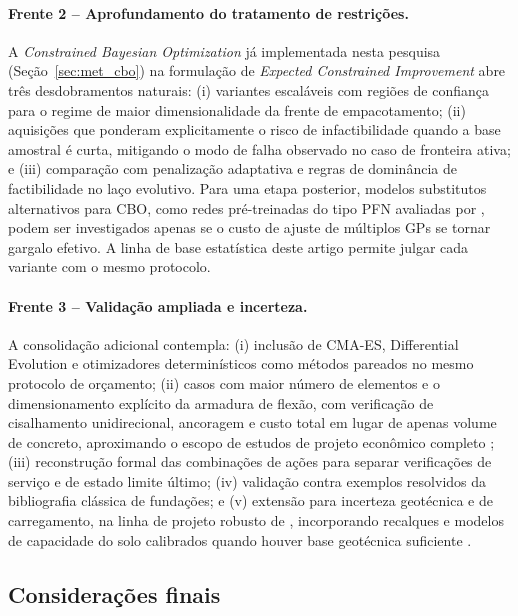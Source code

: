 \paragraph{Frente 2 -- Aprofundamento do tratamento de restrições.}
A \textit{Constrained Bayesian Optimization} já implementada nesta pesquisa (Seção~\ref{sec:met_cbo}) na formulação de \textit{Expected Constrained Improvement}  abre três desdobramentos naturais: (i) variantes escaláveis com regiões de confiança  para o regime de maior dimensionalidade da frente de empacotamento; (ii) aquisições que ponderam explicitamente o risco de infactibilidade quando a base amostral é curta, mitigando o modo de falha observado no caso de fronteira ativa; e (iii) comparação com penalização adaptativa e regras de dominância de factibilidade no laço evolutivo. Para uma etapa posterior, modelos substitutos alternativos para CBO, como redes pré-treinadas do tipo PFN avaliadas por , podem ser investigados apenas se o custo de ajuste de múltiplos GPs se tornar gargalo efetivo. A linha de base estatística deste artigo permite julgar cada variante com o mesmo protocolo.

\paragraph{Frente 3 -- Validação ampliada e incerteza.}
A consolidação adicional contempla: (i) inclusão de CMA-ES, Differential Evolution e otimizadores determinísticos como métodos pareados no mesmo protocolo de orçamento; (ii) casos com maior número de elementos e o dimensionamento explícito da armadura de flexão, com verificação de cisalhamento unidirecional, ancoragem e custo total em lugar de apenas volume de concreto, aproximando o escopo de estudos de projeto econômico completo ; (iii) reconstrução formal das combinações de ações para separar verificações de serviço e de estado limite último; (iv) validação contra exemplos resolvidos da bibliografia clássica de fundações; e (v) extensão para incerteza geotécnica e de carregamento, na linha de projeto robusto de , incorporando recalques e modelos de capacidade do solo calibrados quando houver base geotécnica suficiente .

\subsection{Considerações finais}

